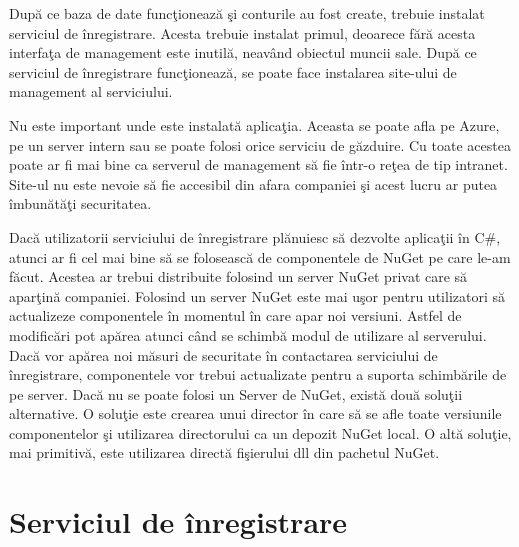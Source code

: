 \documentclass[a4paper,12pt]{report}
\begin{document}
Dup\u a ce baza de date func\c tioneaz\u a \c si conturile au fost create, trebuie instalat serviciul de \^inregistrare.
Acesta trebuie instalat primul, deoarece f\u ar\u a acesta interfa\c ta de management este inutil\u a, neav\^and obiectul muncii
sale. Dup\u a ce  serviciul de \^inregistrare func\c tioneaz\u a, se poate face instalarea site-ului de management al 
serviciului.

Nu este important unde este instalat\u a aplica\c tia. Aceasta se poate afla pe Azure, pe un server intern sau se poate
folosi orice serviciu de g\u azduire. Cu toate acestea poate ar fi mai bine ca serverul de management s\u a fie \^intr-o
re\c tea de tip intranet. Site-ul nu este nevoie s\u a fie accesibil din afara companiei \c si acest lucru ar 
putea \^imbun\u at\u a\c ti securitatea.

Dac\u a utilizatorii serviciului de \^inregistrare pl\u anuiesc s\u a dezvolte aplica\c tii \^in C\#,
atunci ar fi cel mai bine s\u a se foloseasc\u a de componentele de NuGet pe care le-am f\u acut.
Acestea ar trebui distribuite folosind un server NuGet privat care s\u a apar\c tin\u a companiei.
Folosind un server NuGet este mai u\c sor pentru utilizatori s\u a actualizeze componentele \^in momentul 
\^in care apar noi versiuni. Astfel de modific\u ari pot ap\u area atunci c\^and se schimb\u a modul de utilizare 
al serverului. Dac\u a vor ap\u area noi m\u asuri de securitate \^in contactarea serviciului de \^inregistrare,
componentele vor trebui actualizate pentru a suporta schimb\u arile de pe server. Dac\u a nu se poate folosi 
un Server de NuGet, exist\u a dou\u a solu\c tii alternative. O solu\c tie este crearea unui director \^in care s\u a se afle toate versiunile 
componentelor \c si utilizarea directorului ca un depozit NuGet local. O alt\u a solu\c tie, mai primitiv\u a, 
este utilizarea direct\u a fi\c sierului dll din pachetul NuGet.

\section{Serviciul de \^inregistrare}
\end{document}
